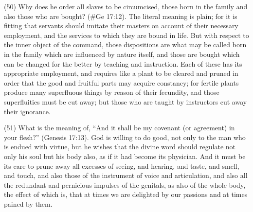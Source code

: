 (50) Why does he order all slaves to be circumcised, those born in the family and also those who
are bought? (\#Ge 17:12). The literal meaning is plain; for it is fitting that servants should
imitate their masters on account of their necessary employment, and the services to which they
are bound in life. But with respect to the inner object of the command, those dispositions are what
may be called born in the family which are influenced by nature itself, and those are bought which
can be changed for the better by teaching and instruction. Each of these has its appropriate
employment, and requires like a plant to be cleared and pruned in order that the good and fruitful
parts may acquire constancy; for fertile plants produce many superfluous things by reason of their
fecundity, and those superfluities must be cut away; but those who are taught by instructors cut
away their ignorance.

(51) What is the meaning of, ``And it shall be my covenant (or agreement) in your flesh?'' (Genesis
17:13). God is willing to do good, not only to the man who is endued with virtue, but he wishes that
the divine word should regulate not only his soul but his body also, as if it had become its physician.
And it must be its care to prune away all excesses of seeing, and hearing, and taste, and smell,
and touch, and also those of the instrument of voice and articulation, and also all the redundant and
pernicious impulses of the genitals, as also of the whole body, the effect of which is, that at times
we are delighted by our passions and at times pained by them.

